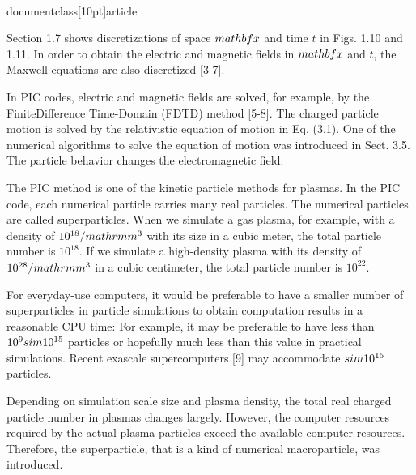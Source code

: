 \\documentclass[10pt]{article}
\begin{document}
{Section 1.7 shows discretizations of space $\\mathbf{x}$ and time $t$ in Figs. 1.10 and 1.11. In order to obtain the electric and magnetic fields in $\\mathbf{x}$ and $t$, the Maxwell equations are also discretized [3-7].

In PIC codes, electric and magnetic fields are solved, for example, by the FiniteDifference Time-Domain (FDTD) method [5-8]. The charged particle motion is solved by the relativistic equation of motion in Eq. (3.1). One of the numerical algorithms to solve the equation of motion was introduced in Sect. 3.5. The particle behavior changes the electromagnetic field.

The PIC method is one of the kinetic particle methods for plasmas. In the PIC code, each numerical particle carries many real particles. The numerical particles are called superparticles. When we simulate a gas plasma, for example, with a density of $10^{18} / \\mathrm{m}^{3}$ with its size in a cubic meter, the total particle number is $10^{18}$. If we simulate a high-density plasma with its density of $10^{28} / \\mathrm{m}^{3}$ in a cubic centimeter, the total particle number is $10^{22}$.

For everyday-use computers, it would be preferable to have a smaller number of superparticles in particle simulations to obtain computation results in a reasonable CPU time: For example, it may be preferable to have less than $10^{9} \\sim 10^{15}$ particles or hopefully much less than this value in practical simulations. Recent exascale supercomputers [9] may accommodate $\\sim 10^{15}$ particles.

Depending on simulation scale size and plasma density, the total real charged particle number in plasmas changes largely. However, the computer resources required by the actual plasma particles exceed the available computer resources. Therefore, the superparticle, that is a kind of numerical macroparticle, was introduced.

}
\end{document}
